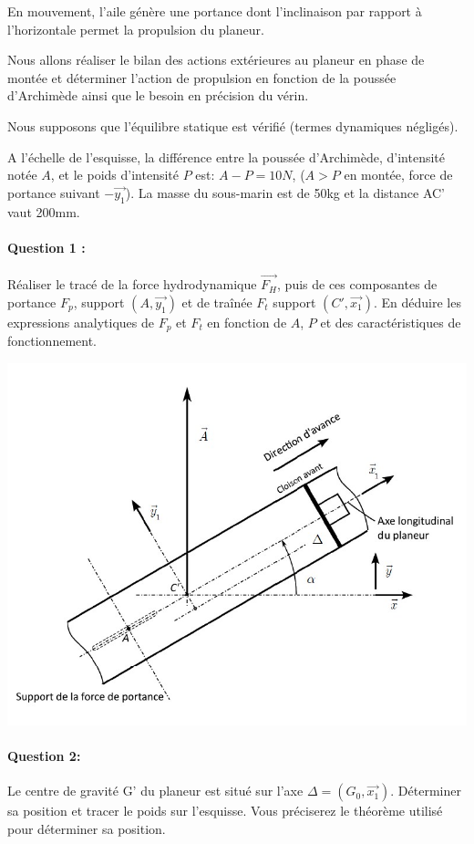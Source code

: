 En mouvement, l'aile génère une portance dont l'inclinaison par rapport à l'horizontale permet la propulsion du planeur.

Nous allons réaliser le bilan des actions extérieures au planeur en phase de montée et déterminer l'action de propulsion en fonction de la poussée d'Archimède ainsi que le besoin en précision du vérin.

Nous supposons que l'équilibre statique est vérifié (termes dynamiques négligés).

A l'échelle de l'esquisse, la différence entre la poussée d'Archimède, d'intensité notée $A$, et le poids d'intensité $P$ est: $A-P=10N$, ($A>P$ en montée, force de portance suivant $-\overrightarrow{y_1}$). La masse du sous-marin est de 50kg et la distance AC' vaut 200mm.

\paragraph{Question 1 :} Réaliser le tracé de la force hydrodynamique $\overrightarrow{F_H}$, puis de ces composantes de portance $F_p$, support $(A,\overrightarrow{y_1})$ et de traînée $F_t$ support $(C',\overrightarrow{x_1})$. En déduire les expressions analytiques de $F_p$ et $F_t$ en fonction de $A$, $P$ et des caractéristiques de fonctionnement.

\begin{center}
\centering\includegraphics[width=0.7\linewidth]{img/plan_Q1.jpg}
\end{center}

\paragraph{Question 2:} Le centre de gravité G' du planeur est situé sur l'axe $\Delta=(G_0,\overrightarrow{x_1})$. Déterminer sa position et tracer le poids sur l'esquisse. Vous préciserez le théorème utilisé pour déterminer sa position.

